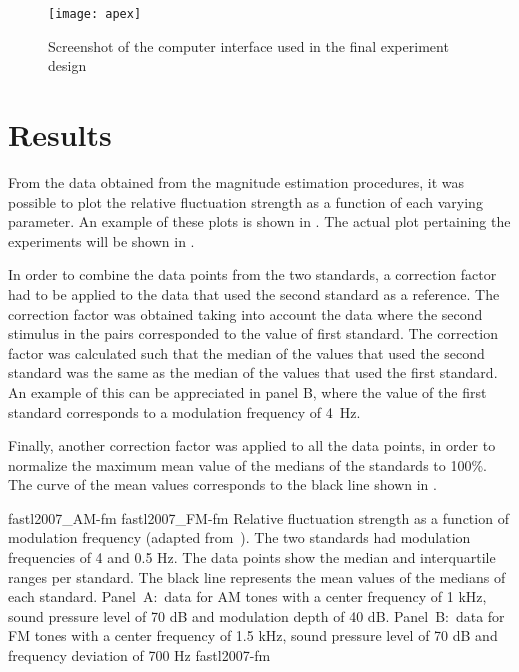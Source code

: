 \documentclass[../main.tex]{subfiles}
\begin{document}
\begin{figure}[!ht]
  \centering
  \texttt{[image: apex]}
  \caption{Screenshot of the computer interface used in the final experiment
    design}
\label{fig:apex}
\end{figure}

\section{Results}

From the data obtained from the magnitude estimation procedures, it was possible
to plot the relative fluctuation strength as a function of each varying
parameter. An example of these plots is shown in . The
actual plot pertaining the experiments will be shown in
.

In order to combine the data points from the two standards, a correction factor
had to be applied to the data that used the second standard as a reference. The
correction factor was obtained taking into account the data where the second
stimulus in the pairs corresponded to the value of first standard. The
correction factor was calculated such that the median of the values that used
the second standard was the same as the median of the values that used the first
standard. An example of this can be appreciated in  panel
B, where the value of the first standard corresponds to a modulation frequency
of 4~Hz.

Finally, another correction factor was applied to all the data points, in order
to normalize the maximum mean value of the medians of the standards to 100\%.
The curve of the mean values corresponds to the black line shown in
.

\myfigurepairlabeled%
  {fastl2007_AM-fm}
  {fastl2007_FM-fm}
  {Relative fluctuation strength as a function of modulation frequency (adapted
    from~\cite[pp.248]{Fastl2007Psychoacoustics}). The two standards had
    modulation frequencies of 4 and 0.5 Hz. The data points show the median and
    interquartile ranges per standard. The black line represents the mean values
    of the medians of each standard. Panel~A:~data for \gls{AM} tones with a
    center frequency of 1 kHz, sound pressure level of 70 dB and modulation
    depth of 40 dB. Panel~B:~data for \gls{FM} tones with a center frequency of
    1.5 kHz, sound pressure level of 70 dB and frequency deviation of 700 Hz}
  {fastl2007-fm}
\end{document}
